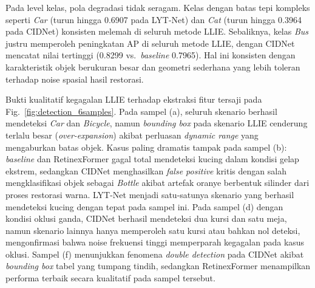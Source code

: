 \documentclass[conference]{IEEEtran}
\begin{document}
Pada level kelas, pola degradasi tidak seragam. Kelas dengan batas tepi kompleks seperti \textit{Car} (turun hingga 0.6907 pada LYT-Net) dan \textit{Cat} (turun hingga 0.3964 pada CIDNet) konsisten melemah di seluruh metode LLIE. Sebaliknya, kelas \textit{Bus} justru memperoleh peningkatan AP di seluruh metode LLIE, dengan CIDNet mencatat nilai tertinggi (0.8299 vs.\ \textit{baseline} 0.7965). Hal ini konsisten dengan karakteristik objek berukuran besar dan geometri sederhana yang lebih toleran terhadap noise spasial hasil restorasi.
 
Bukti kualitatif kegagalan LLIE terhadap ekstraksi fitur tersaji pada Fig.~\ref{fig:detection_6samples}. Pada sampel (a), seluruh skenario berhasil mendeteksi \textit{Car} dan \textit{Bicycle}, namun \textit{bounding box} pada skenario LLIE cenderung terlalu besar (\textit{over-expansion}) akibat perluasan \textit{dynamic range} yang mengaburkan batas objek. Kasus paling dramatis tampak pada sampel (b): \textit{baseline} dan RetinexFormer gagal total mendeteksi kucing dalam kondisi gelap ekstrem, sedangkan CIDNet menghasilkan \textit{false positive} kritis dengan salah mengklasifikasi objek sebagai \textit{Bottle} akibat artefak oranye berbentuk silinder dari proses restorasi warna. LYT-Net menjadi satu-satunya skenario yang berhasil mendeteksi kucing dengan tepat pada sampel ini. Pada sampel (d) dengan kondisi oklusi ganda, CIDNet berhasil mendeteksi dua kursi dan satu meja, namun skenario lainnya hanya memperoleh satu kursi atau bahkan nol deteksi, mengonfirmasi bahwa noise frekuensi tinggi memperparah kegagalan pada kasus oklusi. Sampel (f) menunjukkan fenomena \textit{double detection} pada CIDNet akibat \textit{bounding box} tabel yang tumpang tindih, sedangkan RetinexFormer menampilkan performa terbaik secara kualitatif pada sampel tersebut.
\end{document}
